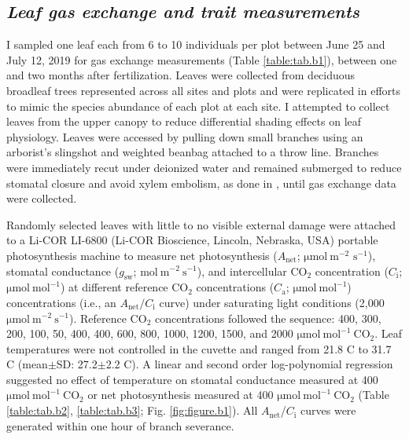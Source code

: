 \subsection{\textit{Leaf gas exchange and trait measurements}}
\noindent I sampled one leaf each from 6 to 10 individuals per plot between June 25 and July 12, 2019 for gas exchange measurements (Table \ref{table:tab.b1}), between one and two months after fertilization. Leaves were collected from deciduous broadleaf trees represented across all sites and plots and were replicated in efforts to mimic the species abundance of each plot at each site. I attempted to collect leaves from the upper canopy to reduce differential shading effects on leaf physiology. Leaves were accessed by pulling down small branches using an arborist’s slingshot and weighted beanbag attached to a throw line. Branches were immediately recut under deionized water and remained submerged to reduce stomatal closure and avoid xylem embolism, as done in , until gas exchange data were collected.

Randomly selected leaves with little to no visible external damage were attached to a Li-COR LI-6800 (Li-COR Bioscience, Lincoln, Nebraska, USA) portable photosynthesis machine to measure net photosynthesis ($A_\mathrm{net}$; $\mathrm{\mu mol\ m^{-2}}$ $\mathrm{{s}^{-1}}$), stomatal conductance ($g_\mathrm{sw}$; $\mathrm{mol\ m^{-2}\ s^{-1}}$), and intercellular CO$_2$ concentration ($C_\mathrm{i}$; $\mathrm{\mu mol\ mol^{-1}}$) at different reference CO$_2$ concentrations ($C_\mathrm{a}$; $\mathrm{\mu mol\ mol^{-1}}$) concentrations (i.e., an $A_\mathrm{net}/C_\mathrm{i}$ curve) under saturating light conditions (2,000 $\mathrm{\mu mol\ m^{-2}\ s^{-1}}$). Reference CO$_2$ concentrations followed the sequence: 400, 300, 200, 100, 50, 400, 400, 600, 800, 1000, 1200, 1500, and 2000 $\mathrm{\mu mol\ mol^{-1}\ CO_2}$. Leaf temperatures were not controlled in the cuvette and ranged from 21.8 \textdegree{}C to 31.7 \textdegree{}C (mean$\pm$SD: 27.2$\pm$2.2 \textdegree{}C). A linear and second order log-polynomial regression suggested no effect of temperature on stomatal conductance measured at 400 $\mathrm{\mu mol\ mol^{-1}\ CO_2}$ or net photosynthesis measured at 400 $\mathrm{\mu mol\ mol^{-1}\ CO_2}$ (Table \ref{table:tab.b2}, \ref{table:tab.b3}; Fig. \ref{fig:figure.b1}). All $A_\mathrm{net}$/$C_\mathrm{i}$ curves were generated within one hour of branch severance.

